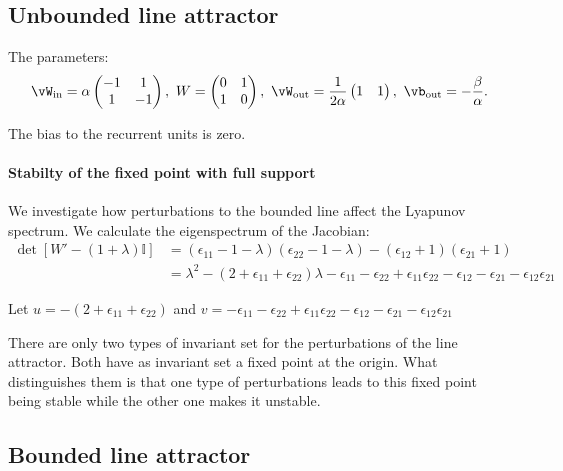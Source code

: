 \documentclass{article} %
\newcounter{ct}
\newcommand{\win}{\vW_{\text{in}}}
\newcommand{\wout}{\vW_{\text{out}}}
\newcommand{\bout}{\vb_{\text{out}}}
\theoremstyle{definition}
\theoremstyle{remark}
\begin{document}
\subsection{Unbounded line attractor}
\label{sec:ubla}

The parameters:
\begin{equation}\label{eq:bla}
\win = \alpha
\begin{pmatrix}
-1  &  1 \\
1  &  -1
\end{pmatrix}, \
W = 
\begin{pmatrix}
0  &  1 \\
1  &  0
\end{pmatrix}, \
\wout = \frac{1}{2\alpha}
\begin{pmatrix}
1  &  1 
\end{pmatrix}, \
\bout = -\frac{\beta}{\alpha}.
\end{equation}

The bias to the recurrent units is zero.


\paragraph{Stabilty of the fixed point with full support}
We investigate how perturbations to the bounded line affect the Lyapunov spectrum.
We calculate the eigenspectrum of the Jacobian:
\begin{align*}
\det [W' -(1+\lambda)\mathbb{I}] &= (\epsilon_{11}-1-\lambda)(\epsilon_{22}-1-\lambda)-(\epsilon_{12}+1)(\epsilon_{21}+1)\\
&=\lambda^2 - (2+\epsilon_{11}+\epsilon_{22})\lambda -\epsilon_{11}-\epsilon_{22}+\epsilon_{11}\epsilon_{22} -\epsilon_{12} - \epsilon_{21} - \epsilon_{12}\epsilon_{21}
\end{align*}

Let 
$u=- (2+\epsilon_{11}+\epsilon_{22})$
and 
$v=-\epsilon_{11}-\epsilon_{22}+\epsilon_{11}\epsilon_{22} -\epsilon_{12} - \epsilon_{21} - \epsilon_{12}\epsilon_{21}$

There are only two types of invariant set for the perturbations of the line attractor. Both have as invariant set a fixed point at the origin. What distinguishes them is that one type of perturbations leads to this fixed point being stable while the other one makes it unstable.



\subsection{Bounded line attractor}\label{sec:supp:bla}
\end{document}
